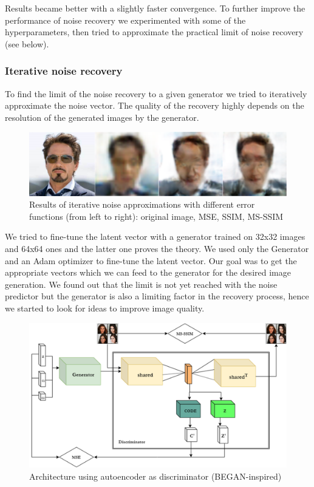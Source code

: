 \documentclass[10pt,journal,compsoc]{IEEEtran}
\begin{document}
Results became better with a slightly faster convergence. To further improve the performance of noise recovery we experimented with some of the hyperparameters, then tried to approximate the practical limit of noise recovery (see below).

\subsubsection{Iterative noise recovery}

To find the limit of the noise recovery to a given generator we tried to iteratively approximate the noise vector. The quality of the recovery highly depends on the resolution of the generated images by the generator. 

\begin{figure}[h]
	\centering
	\includegraphics[width=\linewidth]{pic/tony_iterative}
	\caption{Results of iterative noise approximations with different error functions (from left to right): original image, MSE, SSIM, MS-SSIM}
	\label{fig:tony_iterative}
\end{figure}

We tried to fine-tune the latent vector with a generator trained on 32x32 images and 64x64 ones and the latter one proves the theory. We used only the Generator and an Adam optimizer to fine-tune the latent vector. Our goal was to get the appropriate vectors which we can feed to the generator for the desired image generation. We found out that the limit is not yet reached with the noise predictor but the generator is also a limiting factor in the recovery process, hence we started to look for ideas to improve image quality.

\begin{figure}[b]
	\centering
	\includegraphics[width=\linewidth]{pic/3}
	\caption{Architecture using autoencoder as discriminator (BEGAN-inspired)}
	\label{fig:infogan_ae}
\end{figure}
\end{document}
